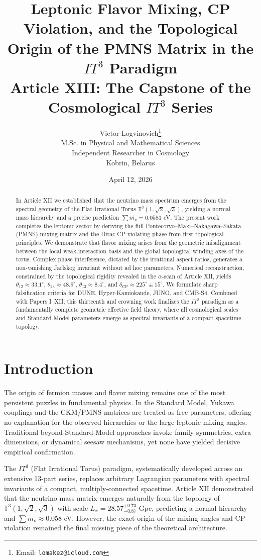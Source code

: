 \documentclass[12pt,a4paper]{article}
\title{\textbf{Leptonic Flavor Mixing, CP Violation, and the Topological Origin of the PMNS Matrix in the $IT^3$ Paradigm}\\
\large Article XIII: The Capstone of the Cosmological $IT^3$ Series}
\author{Victor Logvinovich\thanks{Email: \texttt{lomakez@icloud.com}}\\
M.Sc. in Physical and Mathematical Sciences\\
Independent Researcher in Cosmology\\
Kobrin, Belarus}
\date{April 12, 2026}
\begin{document}
\maketitle

\begin{abstract}
In Article XII we established that the neutrino mass spectrum emerges from the spectral geometry of the Flat Irrational Torus $\mathbb{T}^3(1,\sqrt{2},\sqrt{3})$, yielding a normal mass hierarchy and a precise prediction $\sum m_\nu = 0.0581$ eV. The present work completes the leptonic sector by deriving the full Pontecorvo--Maki--Nakagawa--Sakata (PMNS) mixing matrix and the Dirac CP-violating phase from first topological principles. We demonstrate that flavor mixing arises from the geometric misalignment between the local weak-interaction basis and the global topological winding axes of the torus. Complex phase interference, dictated by the irrational aspect ratios, generates a non-vanishing Jarlskog invariant without ad hoc parameters. Numerical reconstruction, constrained by the topological rigidity revealed in the $\alpha$-scan of Article XII, yields $\theta_{12} \approx 33.1^\circ$, $\theta_{23} \approx 48.9^\circ$, $\theta_{13} \approx 8.4^\circ$, and $\delta_{\text{CP}} \approx 225^\circ \pm 15^\circ$. We formulate sharp falsification criteria for DUNE, Hyper-Kamiokande, JUNO, and CMB-S4. Combined with Papers I--XII, this thirteenth and crowning work finalizes the $IT^3$ paradigm as a fundamentally complete geometric effective field theory, where all cosmological scales and Standard Model parameters emerge as spectral invariants of a compact spacetime topology.
\end{abstract}

\section{Introduction}
The origin of fermion masses and flavor mixing remains one of the most persistent puzzles in fundamental physics. In the Standard Model, Yukawa couplings and the CKM/PMNS matrices are treated as free parameters, offering no explanation for the observed hierarchies or the large leptonic mixing angles. Traditional beyond-Standard-Model approaches invoke family symmetries, extra dimensions, or dynamical seesaw mechanisms, yet none have yielded decisive empirical confirmation.

The $IT^3$ (Flat Irrational Torus) paradigm, systematically developed across an extensive 13-part series, replaces arbitrary Lagrangian parameters with spectral invariants of a compact, multiply-connected spacetime. Article XII demonstrated that the neutrino mass matrix emerges naturally from the topology of $\mathbb{T}^3(1,\sqrt{2},\sqrt{3})$ with scale $L_x = 28.57^{+0.73}_{-0.87}$ Gpc, predicting a normal hierarchy and $\sum m_\nu \approx 0.058$ eV. However, the exact origin of the mixing angles and CP violation remained the final missing piece of the theoretical architecture.
\end{document}
